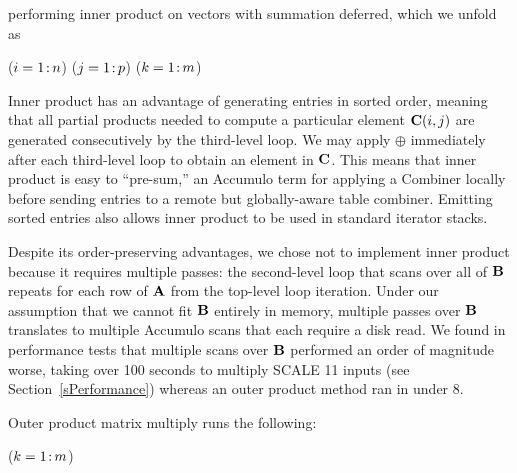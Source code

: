 \noindent %
performing inner %
product on vectors with summation deferred,
which we unfold as

\removelatexerror
\begin{algorithm}[H]
\vspace{\algspace}
\fore($i = 1\colon\! n$){
\fore($j = 1\colon\! p$){
\fore($k = 1\colon\! m$){
}}}
\vspace{\algspace}
\end{algorithm}

Inner product has an advantage of generating entries in sorted order, meaning that all partial products needed 
to compute a particular element $\mathbf{C}(i,j)$ are generated consecutively by the third-level loop.
We may apply $\oplus$ immediately after each third-level loop to obtain an element in $\mathbf{C}$.
This means that inner product is easy to ``pre-sum,'' an Accumulo term for applying a Combiner
locally before sending entries to a remote but globally-aware table combiner.
Emitting sorted entries also allows inner product to be used in standard iterator stacks.

Despite its order-preserving advantages, we chose not to implement inner product 
because it requires multiple passes:
the second-level loop that scans over all of $\mathbf{B}$
repeats for each row of $\mathbf{A}$ from the top-level loop iteration.
Under our assumption that we cannot fit $\mathbf{B}$ entirely in memory,
multiple passes over $\mathbf{B}$ translates to multiple Accumulo scans that each require a disk read.
We found in performance tests that multiple scans over $\mathbf{B}$ 
performed an order of magnitude worse, taking over 100 seconds to multiply SCALE 11 inputs 
(see Section~\ref{sPerformance})
whereas an outer product method ran in under 8.

Outer product matrix multiply runs the following:

\removelatexerror
\begin{algorithm}[H]
\vspace{\algspace}
\fore($k = 1\colon\! m$){
}
\vspace{\algspace}
\end{algorithm}

